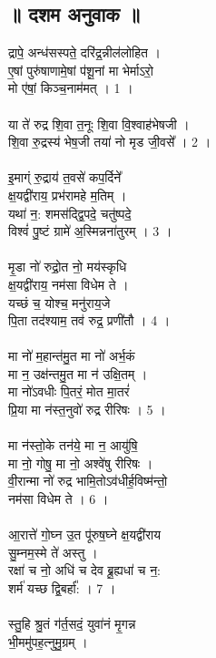 \subsection{॥ दशम अनुवाक ॥}
द्रापे॒ अन्ध॑सस्पते॒ दरि॑द्र॒न्नील॑लोहित ।\\
ए॒षां पुरु॑षाणामे॒षां प॑शू॒नां मा भेर्माऽरो॒\\
मो ए॑षां॒ किञ्च॒नाम॑मत् । 1 ।\\
\\
या ते॑ रुद्र शि॒वा त॒नूः शि॒वा वि॒श्वाह॑भेषजी ।\\
शि॒वा रु॒द्रस्य॑ भेष॒जी तया॑ नो मृड जी॒वसे᳚ । 2 ।\\
\\
इ॒माग्ं रु॒द्राय॑ त॒वसे॑ कप॒र्दिने᳚\\
क्ष॒यद्वी॑राय॒ प्रभ॑रामहे म॒तिम् ।\\
यथा॑ न॒: शमस॑द्द्वि॒पदे॒ चतु॑ष्पदे॒\\
विश्वं॑ पु॒ष्टं ग्रामे॑ अ॒स्मिन्नना॑तुरम् । 3 ।\\
\\
मृ॒डा नो॑ रुद्रो॒त नो॒ मय॑स्कृधि\\
क्ष॒यद्वी॑राय॒ नम॑सा विधेम ते ।\\
यच्छं च॒ योश्च॒ मनु॑राय॒जे\\
पि॒ता तद॑श्याम॒ तव॑ रुद्र॒ प्रणी॑तौ । 4 ।\\
\\
मा नो॑ म॒हान्त॑मु॒त मा नो॑ अर्भ॒कं\\
मा न॒ उक्ष॑न्तमु॒त मा न॑ उक्षि॒तम् ।\\
मा नो॑ऽवधीः पि॒तरं॒ मोत मा॒तरं॑\\
प्रि॒या मा न॑स्त॒नुवो॑ रुद्र रीरिषः । 5 ।\\
\\
मा न॑स्तो॒के तन॑ये॒ मा न॒ आयु॑षि॒\\
मा नो॒ गोषु॒ मा नो॒ अश्वे॑षु रीरिषः ।\\
वी॒रान्मा नो॑ रुद्र भामि॒तोऽव॑धीर्ह॒विष्म॑न्तो॒\\
नम॑सा विधेम ते । 6 ।\\
\\
आ॒रात्ते॑ गो॒घ्न उ॒त पू॑रुष॒घ्ने क्ष॒यद्वी॑राय\\
सु॒म्नम॒स्मे ते॑ अस्तु ।\\
रक्षा॑ च नो॒ अधि॑ च देव ब्रू॒ह्यधा॑ च न॒:\\
शर्म॑ यच्छ द्वि॒बर्हा᳚: । 7 ।\\
\\
स्तु॒हि श्रु॒तं ग॑र्त॒सदं॒ युवा॑नं मृ॒गन्न\\
भी॒ममु॑पह॒त्नुमु॒ग्रम् ।\\
